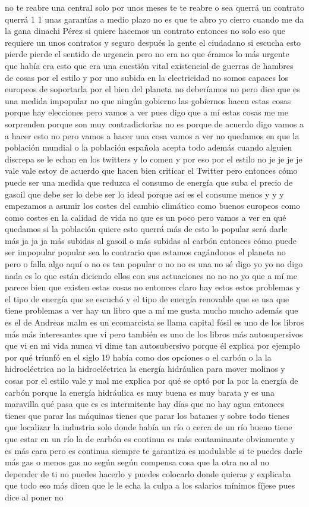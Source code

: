 no te reabre una central solo por unos meses te te reabre o sea querrá un contrato querrá 1 1 unas garantías a medio plazo no es que te abro yo cierro cuando me da la gana dinachi Pérez si quiere hacemos un contrato entonces no solo eso que requiere un unos contratos y seguro después la gente el ciudadano si escucha esto pierde pierde el sentido de urgencia pero no era no que éramos lo más urgente que había era esto que era una cuestión vital existencial de guerras de hambres de cosas por el estilo y por uno subida en la electricidad no somos capaces los europeos de soportarla por el bien del planeta no deberíamos no pero dice que es una medida impopular no que ningún gobierno las gobiernos hacen estas cosas porque hay elecciones pero vamos a ver pues digo que a mí estas cosas me me sorprenden porque son muy contradictorias no es porque de acuerdo digo vamos a a hacer esto no pero vamos a hacer una cosa vamos a ver no quedamos en que la población mundial o la población española acepta todo además cuando alguien discrepa se le echan en los twitters y lo comen y por eso por el estilo no je je je je vale vale estoy de acuerdo que hacen bien criticar el Twitter pero entonces cómo puede ser una medida que reduzca el consumo de energía que suba el precio de gasoil que debe ser lo debe ser lo ideal porque así es el consume menos y y y empezamos a asumir los costes del cambio climático como buenos europeos como como costes en la calidad de vida no que es un poco pero vamos a ver en qué quedamos si la población quiere esto querrá más de esto lo popular será darle más ja ja ja más subidas al gasoil o más subidas al carbón entonces cómo puede ser impopular popular sea lo contrario que estamos cagándonos el planeta no pero o falla algo aquí o no es tan popular o no no es una no sé digo yo yo no digo nada es lo que están diciendo ellos con sus actuaciones no no no yo que a mí me parece bien que existen estas cosas no entonces claro hay estos estos problemas y el tipo de energía que se escuchó y el tipo de energía renovable que se usa que tiene problemas a ver hay un libro que a mí me gusta mucho mucho además que es el de Andreas malm es un ecomarcista se llama capital fósil es uno de los libros más más interesantes que vi pero también es uno de los libros más autosupersivos que vi en mi vida nunca vi dime tan autosubersivo porque él explica por ejemplo por qué triunfó en el siglo 19 había como dos opciones o el carbón o la la hidroeléctrica no la hidroeléctrica la energía hidráulica para mover molinos y cosas por el estilo vale y mal me explica por qué se optó por la por la energía de carbón porque la energía hidráulica es muy buena es muy barata y es una maravilla qué pasa que es es intermitente hay días que no hay agua entonces tienes que parar las máquinas tienes que parar los batanes y sobre todo tienes que localizar la industria solo donde había un río o cerca de un río bueno tiene que estar en un río la de carbón es continua es más contaminante obviamente y es más cara pero es continua siempre te garantiza es modulable si te puedes darle más gas o menos gas no según según compensa cosa que la otra no al no depender de ti no puedes hacerlo y puedes colocarlo donde quieras y explicaba que todo eso más dicen que le le echa la culpa a los salarios mínimos fíjese pues dice al poner no 